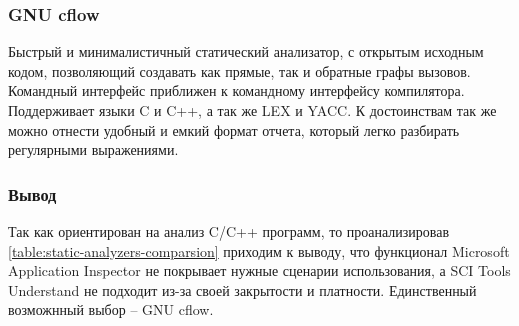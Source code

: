 \subsubsection{GNU cflow}\label{sec:ch1/sec3/sub1/sub3}
 Быстрый и минималистичный статический анализатор, с открытым исходным кодом,
 позволяющий создавать как прямые, так и обратные графы вызовов. 
 Командный интерфейс приближен к командному интерфейсу компилятора.
 Поддерживает языки C и C++, а так же LEX и YACC.
 К достоинствам так же можно отнести удобный и емкий формат отчета, который легко
 разбирать регулярными выражениями.

\subsubsection{Вывод}\label{sec:ch1/sec3/sub1/sub4}
Так как {\ProgModule} ориентирован на анализ C/C++ программ, то проанализировав
\autoref{table:static-analyzers-comparsion} приходим к выводу, что функционал 
Microsoft Application Inspector не покрывает нужные сценарии использования, 
а SCI Tools Understand  не подходит из-за своей закрытости и платности.
Единственный возможнный выбор -- GNU cflow. 

